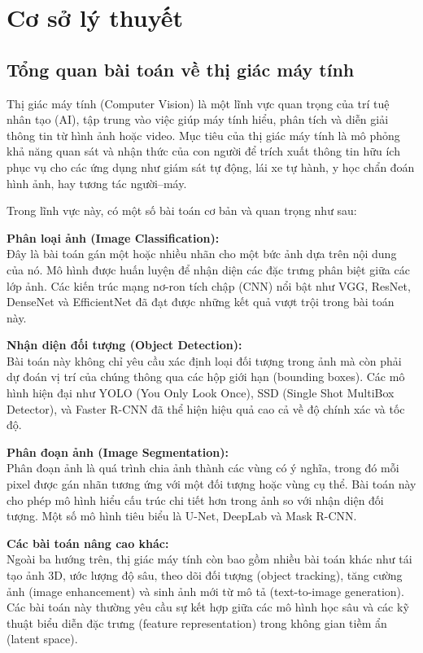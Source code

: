 \chapter{Cơ sở lý thuyết}

\section{Tổng quan bài toán về thị giác máy tính}
Thị giác máy tính (Computer Vision) là một lĩnh vực quan trọng của trí tuệ nhân tạo (AI), tập trung vào việc giúp máy tính hiểu, phân tích và diễn giải thông tin từ hình ảnh hoặc video. Mục tiêu của thị giác máy tính là mô phỏng khả năng quan sát và nhận thức của con người để trích xuất thông tin hữu ích phục vụ cho các ứng dụng như giám sát tự động, lái xe tự hành, y học chẩn đoán hình ảnh, hay tương tác người–máy.

Trong lĩnh vực này, có một số bài toán cơ bản và quan trọng như sau:

\textbf{Phân loại ảnh (Image Classification):} \\
Đây là bài toán gán một hoặc nhiều nhãn cho một bức ảnh dựa trên nội dung của nó. Mô hình được huấn luyện để nhận diện các đặc trưng phân biệt giữa các lớp ảnh. Các kiến trúc mạng nơ-ron tích chập (CNN) nổi bật như VGG, ResNet, DenseNet và EfficientNet đã đạt được những kết quả vượt trội trong bài toán này.

\textbf{Nhận diện đối tượng (Object Detection):} \\
Bài toán này không chỉ yêu cầu xác định loại đối tượng trong ảnh mà còn phải dự đoán vị trí của chúng thông qua các hộp giới hạn (bounding boxes). Các mô hình hiện đại như YOLO (You Only Look Once), SSD (Single Shot MultiBox Detector), và Faster R-CNN đã thể hiện hiệu quả cao cả về độ chính xác và tốc độ.

\textbf{Phân đoạn ảnh (Image Segmentation):} \\
Phân đoạn ảnh là quá trình chia ảnh thành các vùng có ý nghĩa, trong đó mỗi pixel được gán nhãn tương ứng với một đối tượng hoặc vùng cụ thể. Bài toán này cho phép mô hình hiểu cấu trúc chi tiết hơn trong ảnh so với nhận diện đối tượng. Một số mô hình tiêu biểu là U-Net, DeepLab và Mask R-CNN.

\textbf{Các bài toán nâng cao khác:} \\
Ngoài ba hướng trên, thị giác máy tính còn bao gồm nhiều bài toán khác như tái tạo ảnh 3D, ước lượng độ sâu, theo dõi đối tượng (object tracking), tăng cường ảnh (image enhancement) và sinh ảnh mới từ mô tả (text-to-image generation). Các bài toán này thường yêu cầu sự kết hợp giữa các mô hình học sâu và các kỹ thuật biểu diễn đặc trưng (feature representation) trong không gian tiềm ẩn (latent space).


